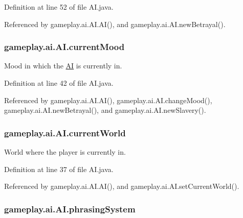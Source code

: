 Definition at line 52 of file A\-I.\-java.



Referenced by gameplay.\-ai.\-A\-I.\-A\-I(), and gameplay.\-ai.\-A\-I.\-new\-Betrayal().

\hypertarget{a00001_aad698027b11d4b58a4da8c2952484ccb}{
\subsubsection[{current\-Mood}]{ gameplay.\-ai.\-A\-I.\-current\-Mood\hspace{0.3cm}{\ttfamily [protected]}}}\label{a00001_aad698027b11d4b58a4da8c2952484ccb}


Mood in which the \hyperlink{a00001}{A\-I} is currently in. 



Definition at line 42 of file A\-I.\-java.



Referenced by gameplay.\-ai.\-A\-I.\-A\-I(), gameplay.\-ai.\-A\-I.\-change\-Mood(), gameplay.\-ai.\-A\-I.\-new\-Betrayal(), and gameplay.\-ai.\-A\-I.\-new\-Slavery().

\hypertarget{a00001_ae4344290e04c468cdd631fc367f4f885}{
\subsubsection[{current\-World}]{ gameplay.\-ai.\-A\-I.\-current\-World\hspace{0.3cm}{\ttfamily [protected]}}}\label{a00001_ae4344290e04c468cdd631fc367f4f885}


World where the player is currently in. 



Definition at line 37 of file A\-I.\-java.



Referenced by gameplay.\-ai.\-A\-I.\-A\-I(), and gameplay.\-ai.\-A\-I.\-set\-Current\-World().

\hypertarget{a00001_ae868fc7b0dc6cab4bebd1d97712a6e7e}{
\subsubsection[{phrasing\-System}]{ gameplay.\-ai.\-A\-I.\-phrasing\-System\hspace{0.3cm}{\ttfamily [protected]}}}\label{a00001_ae868fc7b0dc6cab4bebd1d97712a6e7e}


